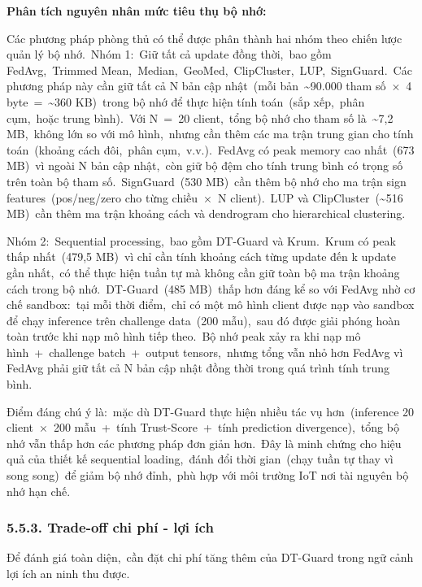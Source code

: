 \textbf{Phân tích nguyên nhân mức tiêu thụ bộ nhớ:}

Các phương pháp phòng thủ có thể được phân thành hai nhóm theo chiến lược quản lý bộ nhớ.~Nhóm 1:~Giữ tất cả update đồng thời,~bao gồm FedAvg,~Trimmed Mean,~Median,~GeoMed,~ClipCluster,~LUP,~SignGuard.~Các phương pháp này cần giữ tất cả N bản cập nhật~(mỗi bản~\textasciitilde90.000 tham số~×~4 byte~=~\textasciitilde360 KB)~trong bộ nhớ để thực hiện tính toán~(sắp xếp,~phân cụm,~hoặc trung bình).~Với N~=~20 client,~tổng bộ nhớ cho tham số là~\textasciitilde7,2 MB,~không lớn so với mô hình,~nhưng cần thêm các ma trận trung gian cho tính toán~(khoảng cách đôi,~phân cụm,~v.v.).~FedAvg có peak memory cao nhất~(673 MB)~vì ngoài N bản cập nhật,~còn giữ bộ đệm cho tính trung bình có trọng số trên toàn bộ tham số.~SignGuard~(530 MB)~cần thêm bộ nhớ cho ma trận sign features~(pos/neg/zero cho từng chiều~×~N client).~LUP và ClipCluster~(\textasciitilde516 MB)~cần thêm ma trận khoảng cách và dendrogram cho hierarchical clustering.

Nhóm 2:~Sequential processing,~bao gồm DT-Guard và Krum.~Krum có peak thấp nhất~(479,5 MB)~vì chỉ cần tính khoảng cách từng update đến k update gần nhất,~có thể thực hiện tuần tự mà không cần giữ toàn bộ ma trận khoảng cách trong bộ nhớ.~DT-Guard~(485 MB)~thấp hơn đáng kể so với FedAvg nhờ cơ chế sandbox:~tại mỗi thời điểm,~chỉ có một mô hình client được nạp vào sandbox để chạy inference trên challenge data~(200 mẫu),~sau đó được giải phóng hoàn toàn trước khi nạp mô hình tiếp theo.~Bộ nhớ peak xảy ra khi nạp mô hình~+~challenge batch~+~output tensors,~nhưng tổng vẫn nhỏ hơn FedAvg vì FedAvg phải giữ tất cả N bản cập nhật đồng thời trong quá trình tính trung bình.

Điểm đáng chú ý là:~mặc dù DT-Guard thực hiện nhiều tác vụ hơn~(inference 20 client~×~200 mẫu~+~tính Trust-Score~+~tính prediction divergence),~tổng bộ nhớ vẫn thấp hơn các phương pháp đơn giản hơn.~Đây là minh chứng cho hiệu quả của thiết kế sequential loading,~đánh đổi thời gian~(chạy tuần tự thay vì song song)~để giảm bộ nhớ đỉnh,~phù hợp với môi trường IoT nơi tài nguyên bộ nhớ hạn chế.

\subsubsection{5.5.3. Trade-off chi phí - lợi ích}\label{trade-off-chi-phuxed---lux1ee3i-uxedch}

Để đánh giá toàn diện,~cần đặt chi phí tăng thêm của DT-Guard trong ngữ cảnh lợi ích an ninh thu được.

